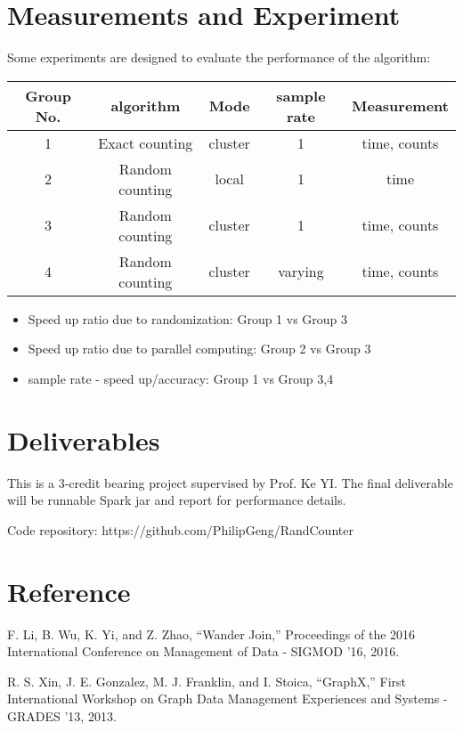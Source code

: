 \documentclass[11pt]{article}
\begin{document}
\section*{Measurements and Experiment}

\item Some experiments are designed to evaluate the performance of the algorithm:\\


\begin{tabular}{|c|c|c|c|c|}
\hline
\hline
Group No. & algorithm & Mode & sample rate & Measurement\\
\hline
\hline
1 & Exact counting & cluster & 1 & time, counts  \\
\hline
2 & Random counting & local & 1 & time  \\
\hline
3 & Random counting & cluster & 1 & time, counts  \\
\hline
4 & Random counting & cluster & varying & time, counts  \\
\hline
\end{tabular}

\begin{itemize}
\item Speed up ratio due to randomization: Group 1 vs Group 3
\item Speed up ratio due to parallel computing: Group 2 vs Group 3
\item sample rate - speed up/accuracy: Group 1 vs Group 3,4
\end{itemize}

\section*{Deliverables}
\item This is a 3-credit bearing project supervised by Prof. Ke YI. The final deliverable will be runnable Spark jar and report for performance details.\\

\item Code repository: https://github.com/PhilipGeng/RandCounter\\

\section*{Reference}
\item F. Li, B. Wu, K. Yi, and Z. Zhao, “Wander Join,” Proceedings of the 2016 International Conference on Management of Data - SIGMOD '16, 2016. \\

\item R. S. Xin, J. E. Gonzalez, M. J. Franklin, and I. Stoica, “GraphX,” First International Workshop on Graph Data Management Experiences and Systems - GRADES '13, 2013.\\
\end{document}
